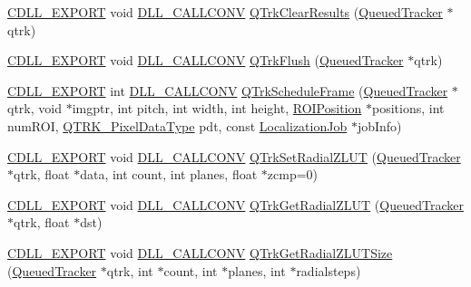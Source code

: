 \begin{DoxyCompactItemize}
\item 
\hyperlink{dllmacros_8h_af97e4004759ff877db017c3d1a855482}{C\+D\+L\+L\+\_\+\+E\+X\+P\+O\+RT} void \hyperlink{dllmacros_8h_a6596c37c55424b395798708344d63791}{D\+L\+L\+\_\+\+C\+A\+L\+L\+C\+O\+NV} \hyperlink{group__c__api_gaf26eb7c51cc81961c873246322dea1a4}{Q\+Trk\+Clear\+Results} (\hyperlink{class_queued_tracker}{Queued\+Tracker} $\ast$qtrk)
\item 
\hyperlink{dllmacros_8h_af97e4004759ff877db017c3d1a855482}{C\+D\+L\+L\+\_\+\+E\+X\+P\+O\+RT} void \hyperlink{dllmacros_8h_a6596c37c55424b395798708344d63791}{D\+L\+L\+\_\+\+C\+A\+L\+L\+C\+O\+NV} \hyperlink{group__c__api_ga77a94e6a0f70958385240b81ca2d31c9}{Q\+Trk\+Flush} (\hyperlink{class_queued_tracker}{Queued\+Tracker} $\ast$qtrk)
\item 
\hyperlink{dllmacros_8h_af97e4004759ff877db017c3d1a855482}{C\+D\+L\+L\+\_\+\+E\+X\+P\+O\+RT} int \hyperlink{dllmacros_8h_a6596c37c55424b395798708344d63791}{D\+L\+L\+\_\+\+C\+A\+L\+L\+C\+O\+NV} \hyperlink{group__c__api_gae5ef39f758a31d9fc493da07d358cc04}{Q\+Trk\+Schedule\+Frame} (\hyperlink{class_queued_tracker}{Queued\+Tracker} $\ast$qtrk, void $\ast$imgptr, int pitch, int width, int height, \hyperlink{struct_r_o_i_position}{R\+O\+I\+Position} $\ast$positions, int num\+R\+OI, \hyperlink{qtrk__c__api_8h_aad82367b3ea592a142bb50a2fb538b0b}{Q\+T\+R\+K\+\_\+\+Pixel\+Data\+Type} pdt, const \hyperlink{struct_localization_job}{Localization\+Job} $\ast$job\+Info)
\item 
\hyperlink{dllmacros_8h_af97e4004759ff877db017c3d1a855482}{C\+D\+L\+L\+\_\+\+E\+X\+P\+O\+RT} void \hyperlink{dllmacros_8h_a6596c37c55424b395798708344d63791}{D\+L\+L\+\_\+\+C\+A\+L\+L\+C\+O\+NV} \hyperlink{group__c__api_ga1a3edf23919c33a549b2fb0b778684a9}{Q\+Trk\+Set\+Radial\+Z\+L\+UT} (\hyperlink{class_queued_tracker}{Queued\+Tracker} $\ast$qtrk, float $\ast$data, int count, int planes, float $\ast$zcmp=0)
\item 
\hyperlink{dllmacros_8h_af97e4004759ff877db017c3d1a855482}{C\+D\+L\+L\+\_\+\+E\+X\+P\+O\+RT} void \hyperlink{dllmacros_8h_a6596c37c55424b395798708344d63791}{D\+L\+L\+\_\+\+C\+A\+L\+L\+C\+O\+NV} \hyperlink{group__c__api_gab5d2705f9d756f2c57568a50755e9212}{Q\+Trk\+Get\+Radial\+Z\+L\+UT} (\hyperlink{class_queued_tracker}{Queued\+Tracker} $\ast$qtrk, float $\ast$dst)
\item 
\hyperlink{dllmacros_8h_af97e4004759ff877db017c3d1a855482}{C\+D\+L\+L\+\_\+\+E\+X\+P\+O\+RT} void \hyperlink{dllmacros_8h_a6596c37c55424b395798708344d63791}{D\+L\+L\+\_\+\+C\+A\+L\+L\+C\+O\+NV} \hyperlink{group__c__api_ga870e97e334d0f265eeaa969286bbc32f}{Q\+Trk\+Get\+Radial\+Z\+L\+U\+T\+Size} (\hyperlink{class_queued_tracker}{Queued\+Tracker} $\ast$qtrk, int $\ast$count, int $\ast$planes, int $\ast$radialsteps)

\end{DoxyCompactItemize}
